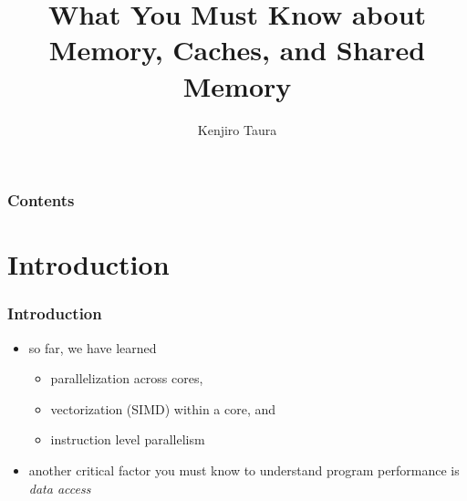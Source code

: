 \documentclass[12pt,dvipdfmx]{beamer}
\title{What You Must Know about Memory, Caches, and Shared Memory}
\institute{}
\author{Kenjiro Taura}
\date{}
\newcommand{\ao}[1]{{\color{blue}#1}}
\begin{document}
\maketitle

\begin{frame}
\frametitle{Contents}
\tableofcontents
\end{frame}

\section{Introduction}

\begin{frame}
\frametitle{Introduction}
\begin{itemize}
\item so far, we have learned 
  \begin{itemize}
  \item parallelization across cores,
  \item vectorization (SIMD) within a core, and
  \item instruction level parallelism 
  \end{itemize}

\item another critical factor you must know to
  understand program performance is 
  \ao{\em data access} 
\end{itemize}
\end{frame}
\end{document}
